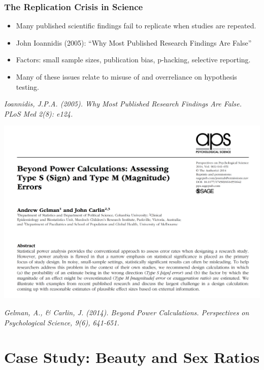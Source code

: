 \documentclass[slidestop,compress,mathserif]{beamer}
\newcommand{\soln}[1]{\textit{#1}}
\begin{document}

\begin{frame}
	\frametitle{The Replication Crisis in Science}
	\begin{itemize}
		\item Many published scientific findings fail to replicate when studies are repeated.
		\item John Ioannidis (2005): ``Why Most Published Research Findings Are False''
		\item Factors: small sample sizes, publication bias, p-hacking, selective reporting.
		\item Many of these issues relate to misuse of and overreliance on hypothesis testing.
	\end{itemize}
	\vspace{1em}
	\soln{\footnotesize Ioannidis, J.P.A. (2005). Why Most Published Research Findings Are False. PLoS Med 2(8): e124.}
\end{frame}

\begin{frame}
	\begin{center}
		\includegraphics[height=0.75\textheight]{figures/Gelman.png}
	\end{center}
	\soln{\footnotesize Gelman, A., \& Carlin, J. (2014). Beyond Power Calculations. Perspectives on Psychological Science, 9(6), 641-651.}
\end{frame}


\section{Case Study: Beauty and Sex Ratios}
\end{document}
